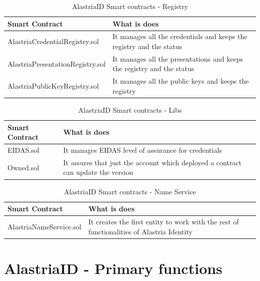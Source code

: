 \documentclass[target=mst,aauheader=]{thud}
\begin{document}
\begin{table}[h!]
    \begin{tabular}{|p{6cm}|p{12cm}|}
    \hline
    Smart Contract & What is does\\ [0.5ex] 
    \hline\hline
    AlastriaCredentialRegistry.sol & It manages all the credentials and keeps the registry and the status\\ 
    \hline
    AlastriaPresentationRegistry.sol & It manages all the presentations and keeps the registry and the status\\
    \hline
    AlastriaPublicKeyRegistry.sol & It manages all the public keys and keeps the registry \\
    \hline
    \end{tabular}
    \caption{AlastriaID Smart contracts - Registry}

\end{table}

\begin{table}[h!]
    \begin{tabular}{|p{6cm}|p{12cm}|}
    \hline
    Smart Contract & What is does\\ [0.5ex] 
    \hline\hline
    EIDAS.sol & It manages EIDAS level of assurance for credentials \\ 
    \hline
    Owned.sol & It assures that just the account which deployed a contract can update the version \\ 
    \hline
    \end{tabular}
    \caption{AlastriaID Smart contracts - Libs}

\end{table}

\begin{table}[h!]
    \begin{tabular}{|p{6cm}|p{12cm}|}
    \hline
    Smart Contract & What is does\\ [0.5ex] 
    \hline\hline
    AlastriaNameService.sol	 & It creates the first entity to work with the rest of functionalities of Alastria Identity \\ 
    \hline
    \end{tabular}
    \caption{AlastriaID Smart contracts - Name Service}

\end{table}

\section{AlastriaID - Primary functions}
\end{document}
